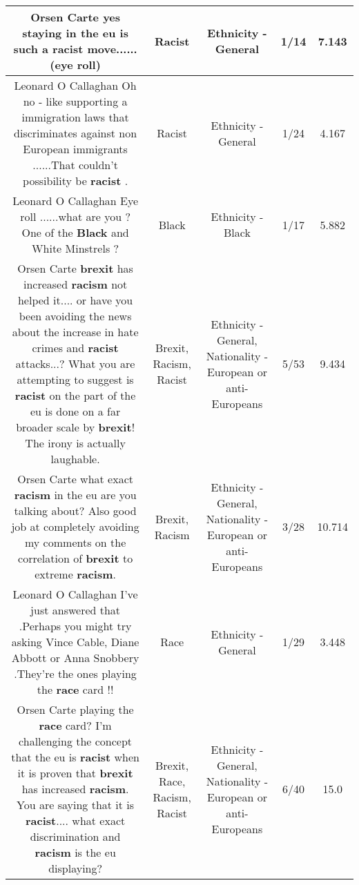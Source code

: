 \documentclass[11pt]{article}
\newlength\mylength
\begin{document}
\begin{center}
\begin{longtable}{|C{.65\mylength}|C{.30\mylength}|C{.12\mylength}|C{.12\mylength}|C{.12\mylength}|}
  \small Orsen Carte yes staying in the eu is such a \textbf{racist} move...... (eye roll)\normalsize   & Racist & Ethnicity - General & 1/14 & 7.143 \\  \hline
  \small Leonard O Callaghan Oh no - like supporting a immigration laws that discriminates against non European immigrants ......That couldn't possibility be \textbf{racist} .\normalsize   & Racist & Ethnicity - General & 1/24 & 4.167 \\  \hline
  \small Leonard O Callaghan Eye roll ......what are you ? One of the \textbf{Black} and White Minstrels ?\normalsize   & Black & Ethnicity - Black & 1/17 & 5.882 \\  \hline
  \small Orsen Carte \textbf{brexit} has increased \textbf{racism}  not helped it.... or have you been avoiding the news about the increase in hate crimes and \textbf{racist} attacks...? What you are attempting to suggest is \textbf{racist} on the part of the eu  is done on a far broader scale by \textbf{brexit}! The irony is actually laughable.\normalsize   & Brexit, Racism, Racist & Ethnicity - General, Nationality - European or anti-Europeans & 5/53 & 9.434 \\  \hline
  \small Orsen Carte what exact \textbf{racism} in the eu are you talking about? Also good job at completely avoiding my comments on the correlation of \textbf{brexit} to extreme \textbf{racism}.\normalsize   & Brexit, Racism & Ethnicity - General, Nationality - European or anti-Europeans & 3/28 & 10.714 \\  \hline
  \small Leonard O Callaghan I've just answered that .Perhaps you might try asking Vince Cable, Diane Abbott or Anna Snobbery .They're the ones playing the \textbf{race} card !!\normalsize   & Race & Ethnicity - General & 1/29 & 3.448 \\  \hline
  \small Orsen Carte playing the \textbf{race} card? I'm challenging the concept that the eu is \textbf{racist} when it is proven that \textbf{brexit} has increased \textbf{racism}. You are saying that it is \textbf{racist}.... what exact discrimination and \textbf{racism} is the eu displaying?\normalsize   & Brexit, Race, Racism, Racist & Ethnicity - General, Nationality - European or anti-Europeans & 6/40 & 15.0 \\  \hline

\end{longtable}
\end{center}
\end{document}

